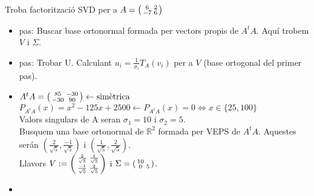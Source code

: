 \documentclass[../main.tex]{subfiles}
\begin{document}
    \begin{exemple}
        Troba factorització SVD per a $A = \begin{psmallmatrix}6 & 2\\-7 & 6\end{psmallmatrix}$
        \begin{itemize}
            \item pas: Buscar base ortonormal formada per vectors propis de $A^tA$. Aquí trobem $V$ i $\Sigma$.
            \item pas: Trobar U. Calculant $u_i = \frac{1}{\sigma_i} T_A (v_i)$ per a $V$ (base ortogonal del primer pas). 
        \end{itemize}
        \begin{itemize}
            \item $A^tA = \begin{psmallmatrix}85 & -30\\-30 & 90\end{psmallmatrix} \leftarrow \text{simètrica}$\\
            $P_{A^tA}(x) = x^2-125x+2500 \leftarrow P_{A^tA}(x) = 0 \Leftrightarrow x \in \{ 25, 100\}$\\
            Valors singulars de A seran $\sigma_1 = 10$ i $\sigma_2 = 5$.\\
            Busquem una base ortonormal de $\mathbb{R}^2$ formada per VEPS de $A^tA$. Aquestes serán $(\frac{2}{\sqrt{5}}, \frac{-1}{\sqrt{5}})$ i $(\frac{1}{\sqrt{5}}, \frac{2}{\sqrt{5}})$.\\
            Llavors $V := \begin{psmallmatrix}\frac{2}{\sqrt{5}} & \frac{1}{\sqrt{5}}\\\frac{-1}{\sqrt{5}} & \frac{2}{\sqrt{5}}\end{psmallmatrix}$ i $\Sigma = \begin{psmallmatrix}10 & \\ 0 & 5\end{psmallmatrix}$.
            \item 
        \end{itemize}
    \end{exemple}
\end{document}
